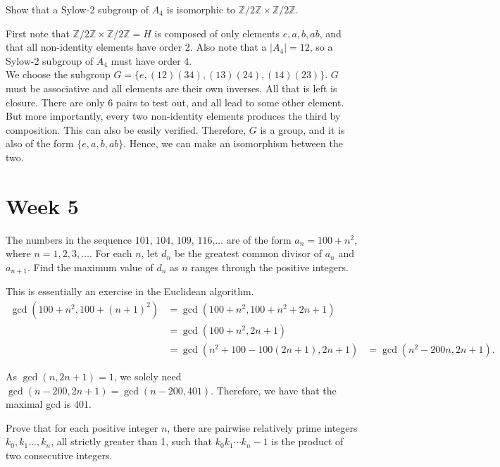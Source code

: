 \documentclass{scrartcl}
\begin{document}
\begin{problem}[7]
    Show that a Sylow-2 subgroup of $A_4$ is isomorphic to $\mathbb{Z}/2\mathbb{Z} \times \mathbb{Z}/2\mathbb{Z}$.
\end{problem}

\begin{soln}
    First note that $\mathbb{Z}/2\mathbb{Z} \times \mathbb{Z}/2\mathbb{Z}=H$ is composed of only elements $e, a, b, ab$, and that all non-identity elements have order 2. Also note that a $|A_4| = 12$, so a Sylow-2 subgroup of $A_4$ must have order 4. \\
    We choose the subgroup $G = \{ e, (12)(34), (13)(24), (14)(23) \}$. $G$ must be associative and all elements are their own inverses. All that is left is closure. There are only $6$ pairs to test out, and all lead to some other element. But more importantly, every two non-identity elements produces the third by composition. This can also be easily verified. Therefore, $G$ is a group, and it is also of the form $\{ e, a, b, ab \}$. Hence, we can make an isomorphism between the two.  
\end{soln}

\section{Week 5}

\begin{problem}[9]
	The numbers in the sequence $101$, $104$, $109$, $116$,$\ldots$ are of the form $a_n=100+n^2$, where $n=1,2,3,\ldots$. For each $n$, let $d_n$ be the greatest common divisor of $a_n$ and $a_{n+1}$. Find the maximum value of $d_n$ as $n$ ranges through the positive integers.
\end{problem}

\begin{soln}
	This is essentially an exercise in the Euclidean algorithm.
	\begin{align*}
		\gcd(100+n^2, 100+(n+1)^2) &= \gcd(100+n^2, 100+n^2+2n+1) \\
		&= \gcd(100+n^2, 2n+1) \\
		&= \gcd(n^2+100-100(2n+1), 2n+1)
		&= \gcd(n^2-200n, 2n+1).
	\end{align*}

	As $\gcd(n, 2n+1) = 1$, we solely need $\gcd(n-200, 2n+1) = \gcd(n-200, 401)$. Therefore, we have that the maximal gcd is $\boxed{401}$.
\end{soln}

\begin{problem}[12]
	Prove that for each positive integer $n$, there are pairwise relatively prime integers $k_0, k_1 \dotsc, k_n$, all strictly greater than 1, such that $k_0 k_1 \dotsm k_n -1$ is the product of two consecutive integers.
\end{problem}
\end{document}

